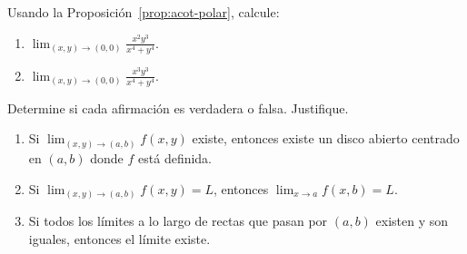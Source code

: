 \begin{prob}
Usando la Proposición~\ref{prop:acot-polar}, calcule:
\begin{enumerate}
  \item $\displaystyle\lim_{(x,y)\to(0,0)}\frac{x^2y^3}{x^4+y^4}$.
  \item $\displaystyle\lim_{(x,y)\to(0,0)}\frac{x^3y^3}{x^4+y^4}$.
\end{enumerate}
\end{prob}

\begin{prob}
Determine si cada afirmación es verdadera o falsa. Justifique.
\begin{enumerate}
    \item Si $\lim_{(x,y)\to(a,b)} f(x,y)$ existe, entonces existe un
    disco abierto centrado en $(a,b)$ donde $f$ está definida.
    \item Si $\lim_{(x,y)\to(a,b)} f(x,y)=L$, entonces
    $\lim_{x\to a} f(x,b)=L$.
    \item Si todos los límites a lo largo de rectas que pasan por
    $(a,b)$ existen y son iguales, entonces el límite existe.
    \end{enumerate}

\end{prob}

